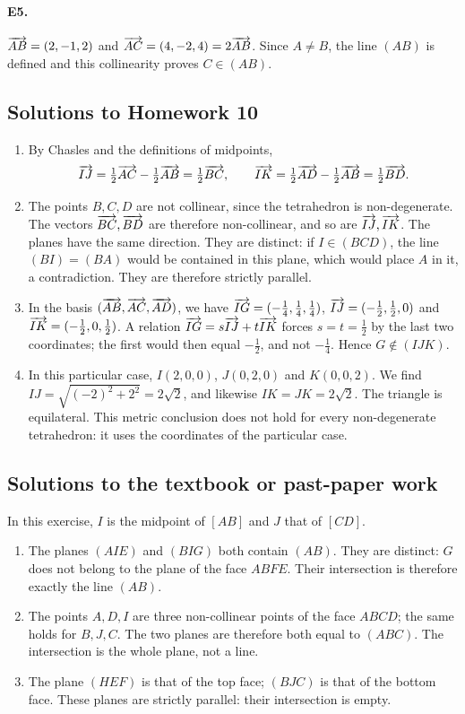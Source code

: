 \paragraph{E5.}$\overrightarrow{AB}=(2,-1,2)$ and $\overrightarrow{AC}=(4,-2,4)=2\overrightarrow{AB}$. Since $A\ne B$, the line $(AB)$ is defined and this collinearity proves $C\in(AB)$.

\subsection{Solutions to Homework 10}\begin{enumerate}
\item By Chasles and the definitions of midpoints,
\[\overrightarrow{IJ}=\tfrac12\overrightarrow{AC}-\tfrac12\overrightarrow{AB}=\tfrac12\overrightarrow{BC},\qquad \overrightarrow{IK}=\tfrac12\overrightarrow{AD}-\tfrac12\overrightarrow{AB}=\tfrac12\overrightarrow{BD}.\]
\item The points $B,C,D$ are not collinear, since the tetrahedron is non-degenerate. The vectors $\overrightarrow{BC},\overrightarrow{BD}$ are therefore non-collinear, and so are $\overrightarrow{IJ},\overrightarrow{IK}$. The planes have the same direction. They are distinct: if $I\in(BCD)$, the line $(BI)=(BA)$ would be contained in this plane, which would place $A$ in it, a contradiction. They are therefore strictly parallel.
\item In the basis $(\overrightarrow{AB},\overrightarrow{AC},\overrightarrow{AD})$, we have $\overrightarrow{IG}=(-\frac{1}{4},\frac{1}{4},\frac{1}{4})$, $\overrightarrow{IJ}=(-\frac{1}{2},\frac{1}{2},0)$ and $\overrightarrow{IK}=(-\frac{1}{2},0,\frac{1}{2})$. A relation $\overrightarrow{IG}=s\overrightarrow{IJ}+t\overrightarrow{IK}$ forces $s=t=\frac{1}{2}$ by the last two coordinates; the first would then equal $-\frac{1}{2}$, and not $-\frac{1}{4}$. Hence $G\notin(IJK)$.
\item In this particular case, $I(2,0,0)$, $J(0,2,0)$ and $K(0,0,2)$. We find $IJ=\sqrt{(-2)^2+2^2}=2\sqrt2$, and likewise $IK=JK=2\sqrt2$. The triangle is equilateral. This metric conclusion does not hold for every non-degenerate tetrahedron: it uses the coordinates of the particular case.
\end{enumerate}

\subsection{Solutions to the textbook or past-paper work}In this exercise, $I$ is the midpoint of $[AB]$ and $J$ that of $[CD]$.
\begin{enumerate}
\item The planes $(AIE)$ and $(BIG)$ both contain $(AB)$. They are distinct: $G$ does not belong to the plane of the face $ABFE$. Their intersection is therefore exactly the line $(AB)$.
\item The points $A,D,I$ are three non-collinear points of the face $ABCD$; the same holds for $B,J,C$. The two planes are therefore both equal to $(ABC)$. The intersection is the whole plane, not a line.
\item The plane $(HEF)$ is that of the top face; $(BJC)$ is that of the bottom face. These planes are strictly parallel: their intersection is empty.
\end{enumerate}

\fi

